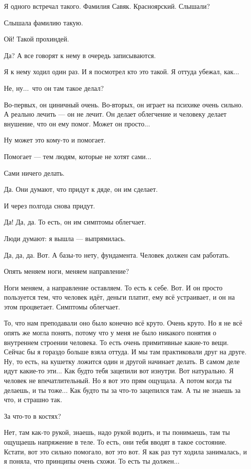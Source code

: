 \I
Я одного встречал такого. Фамилия Савяк. Красноярский. Слышали?

\M
Слышала фамилию такую.

\I
Ой! Такой прохиндей.

\M
Да? А все говорят к нему в очередь записываются.

\I
Я к нему ходил один раз. И я посмотрел кто это такой. Я оттуда
убежал, как...

\M
Не, ну...\ что он там такое делал?

\I
Во-первых, он циничный очень.
Во-вторых, он играет
на психике очень сильно. А реально лечить --- он не лечит.
Он делает облегчение и человеку делает внушение,
что он ему помог. Может он просто...

\M
Ну может это кому-то и помогает.

\I
Помогает --- тем людям, которые не хотят сами...

\M
Сами ничего делать.

\I
Да. Они думают, что придут к дяде, он им сделает.

\M
И через полгода снова придут.

\I
Да! Да, да. То есть, он им симптомы облегчает.

\M
Люди думают: я вышла --- выпрямилась.

\I
Да, да, да. Вот.
А базы-то нету, фундамента. Человек должен сам работать.

\M
Опять меняем ноги, меняем направление?

\I
Ноги меняем, а направление оставляем. То есть к себе. Вот.
И он просто пользуется тем, что человек идёт, деньги платит, ему всё устраивает,
и он на этом процветает. Симптомы облегчает.

\M
То, что нам преподавали оно
было конечно всё круто.
Очень круто. Но я не всё опять же могла понять, потому что у меня не было никакого понятия
о внутреннем строении человека.
То есть очень примитивные какие-то вещи.
Сейчас бы я гораздо больше взяла оттуда. И мы там практиковали друг на друге.
Ну, то есть, на кушетку ложится один и другой начинает делать. В самом деле идут
какие-то эти...
Как будто тебя зацепили вот изнутри.
Вот натурально.
Я человек не впечатлительный.
Но я вот это прям ощущала. А потом когда ты делаешь, и ты тоже...
Как будто ты за что-то зацепился там.
А ты не знаешь за что, и страшно так.

\I
За что-то в костях?

\M
Нет, там как-то рукой, знаешь, надо рукой водить, и ты понимаешь, там
ты ощущаешь напряжение в теле.
То есть, они тебя вводят в такое состояние. Кстати, вот это сильно помогало,
вот это вот.
Я как раз тут ходила занималась, и я поняла,
что принципы очень схожи.
То есть ты должен...

